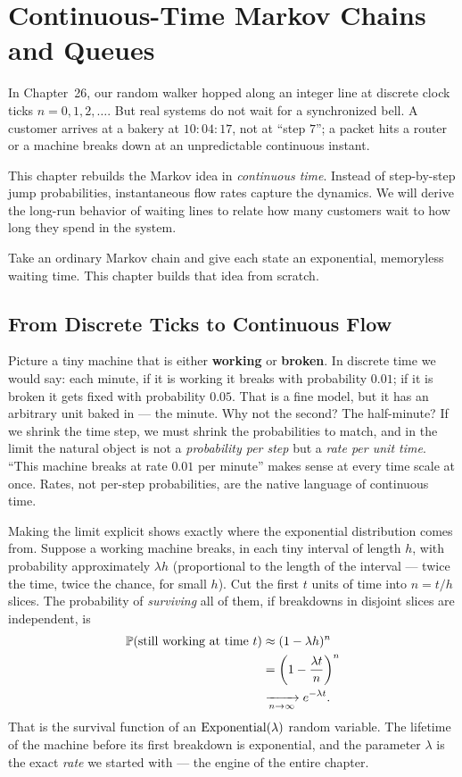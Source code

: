 \chapter{Continuous-Time Markov Chains and Queues}

In Chapter~26, our random walker hopped along an integer line at discrete clock ticks
$n = 0, 1, 2, \dots$. But real systems do not wait for a synchronized bell. A customer
arrives at a bakery at $10\!:\!04\!:\!17$, not at ``step $7$''; a packet hits a router or a
machine breaks down at an unpredictable continuous instant.

This chapter rebuilds the Markov idea in \emph{continuous time}. Instead of step-by-step jump
probabilities, instantaneous flow rates capture the dynamics. We will derive the long-run behavior of
waiting lines to relate how many customers wait to how long they spend in the system.

Take an ordinary Markov chain and give each state an exponential, memoryless waiting
time. This chapter builds that idea from scratch.

\chapterline

\section{From Discrete Ticks to Continuous Flow}
\label{ch27:intro}

\begin{intuitionbox}
Picture a tiny machine that is either \textbf{working} or \textbf{broken}. In discrete time we would
say: each minute, if it is working it breaks with probability $0.01$; if it is broken it gets fixed
with probability $0.05$. That is a fine model, but it has an arbitrary unit baked in --- the minute.
Why not the second? The half-minute? If we shrink the time step, we must shrink the probabilities to
match, and in the limit the natural object is not a \emph{probability per step} but a \emph{rate per
unit time}. ``This machine breaks at rate $0.01$ per minute'' makes sense at every time scale at
once. Rates, not per-step probabilities, are the native language of continuous time.
\end{intuitionbox}

Making the limit explicit shows exactly where the exponential distribution comes
from. Suppose a working machine breaks, in each tiny interval of length $h$, with probability
approximately $\lambda h$ (proportional to the length of the interval --- twice the time, twice the
chance, for small $h$). Cut the first $t$ units of time into $n = t/h$ slices. The probability of
\emph{surviving} all of them, if breakdowns in disjoint slices are independent, is
\begin{align*}
  \P(\text{still working at time } t)
  &\approx (1 - \lambda h)^{n} \\
  &= \left(1 - \frac{\lambda t}{n}\right)^{n} \\
  &\xrightarrow[n \to \infty]{} e^{-\lambda t}.
\end{align*}
That is the survival function of an $\Expo(\lambda)$ random variable. The lifetime of the machine
before its first breakdown is exponential, and the parameter $\lambda$ is the exact \emph{rate} we
started with --- the engine of the entire chapter.

